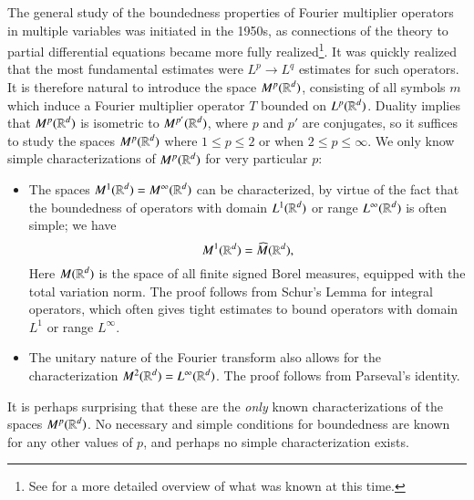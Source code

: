 The general study of the boundedness properties of Fourier multiplier operators in multiple variables was initiated in the 1950s, as connections of the theory to partial differential equations became more fully realized\footnote{See \cite{Hormander1} for a more detailed overview of what was known at this time.}. It was quickly realized that the most fundamental estimates were $L^p \to L^q$ estimates for such operators.
%
%
%
It is therefore natural to introduce the space $M^p(\operatorname{\mathbb{R}}^d)$, consisting of all symbols $m$ which induce a Fourier multiplier operator $T$ bounded on $L^p(\operatorname{\mathbb{R}}^d)$. Duality implies that $M^p(\operatorname{\mathbb{R}}^d)$ is isometric to $M^{p'}(\operatorname{\mathbb{R}}^d)$, where $p$ and $p'$ are conjugates, so it suffices to study the spaces $M^p(\operatorname{\mathbb{R}}^d)$ where $1 \leq p \leq 2$ or when $2 \leq p \leq \infty$. We only know simple characterizations of $M^p(\operatorname{\mathbb{R}}^d)$ for very particular $p$:
%
\begin{itemize}
    \item The spaces $M^1(\operatorname{\mathbb{R}}^d) = M^\infty(\operatorname{\mathbb{R}}^d)$ can be characterized, by virtue of the fact that the boundedness of operators with domain $L^1(\operatorname{\mathbb{R}}^d)$ or range $L^\infty(\operatorname{\mathbb{R}}^d)$ is often simple; we have
    \[ M^1(\operatorname{\mathbb{R}}^d) = \widehat{M}(\operatorname{\mathbb{R}}^d), \]
    Here $M(\operatorname{\mathbb{R}}^d)$ is the space of all finite signed Borel measures, equipped with the total variation norm. The proof follows from Schur's Lemma for integral operators, which often gives tight estimates to bound operators with domain $L^1$ or range $L^\infty$.

    \item The unitary nature of the Fourier transform also allows for the characterization $M^2(\operatorname{\mathbb{R}}^d) = L^\infty(\operatorname{\mathbb{R}}^d)$. The proof follows from Parseval's identity.
\end{itemize}
%
It is perhaps surprising that these are the \emph{only} known characterizations of the spaces $M^p(\operatorname{\mathbb{R}}^d)$. No necessary and simple conditions for boundedness are known for any other values of $p$, and perhaps no simple characterization exists.

